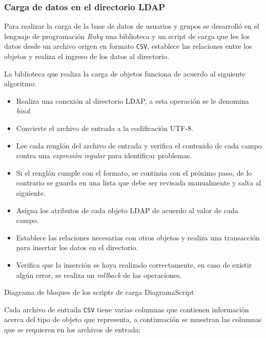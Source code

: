 \newpage
          \subsubsection {Carga de datos en el directorio \textsc{LDAP}}

Para realizar la carga de la base de datos de usuarios y grupos se desarroll\'{o} en el lenguaje de programaci\'{o}n \textsl{Ruby} una biblioteca y un script de carga que lee los datos desde un archivo origen en formato \texttt{CSV}, establece las relaciones entre los objetos y realiza el ingreso de los datos al directorio.

La biblioteca que realiza la carga de objetos funciona de acuerdo al siguiente algoritmo:

\begin{itemize}
  \item Realiza una conexi\'{o}n al directorio LDAP, a esta operaci\'{o}n se le denomina \textit{bind}.
  \item Convierte el archivo de entrada a la codificaci\'{o}n \textsc{UTF-8}.
  \item Lee cada rengl\'{o}n del archivo de entrada y verifica el contenido de cada campo contra una \textit{expresi\'{o}n regular} para identificar problemas.
  \item Si el rengl\'{o}n cumple con el formato, se contin\'{u}a con el pr\'{o}ximo paso, de lo contrario se guarda en una lista que debe ser revisada manualmente y salta al siguiente.
  \item Asigna los atributos de cada objeto LDAP de acuerdo al valor de cada campo.
  \item Establece las relaciones necesarias con otros objetos y realiza una transacci\'{o}n para insertar los datos en el directorio.
  \item Verifica que la inserci\'{o}n se haya realizado correctamente, en caso de existir alg\'{u}n error, se realiza un \textit{rollback} de las operaciones.
\end{itemize}

\diagramblock
{Diagrama de bloques de los scripts de carga}
{DiagramaScript}
{
 {
  
 }
}

Cada archivo de entrada \texttt{CSV} tiene varias columnas que contienen informaci\'{o}n acerca del tipo de objeto que representa, a continuaci\'{o}n se muestran las columnas que se requieren en los archivos de entrada:


